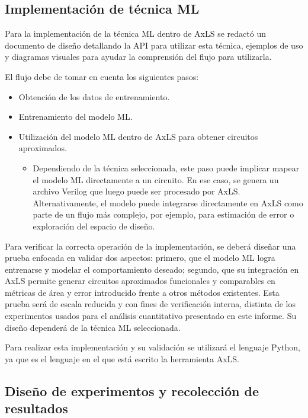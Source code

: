 \subsection{Implementación de técnica ML}

Para la implementación de la técnica ML dentro de AxLS se redactó un documento
de diseño detallando la API para utilizar esta técnica, ejemplos de uso y
diagramas visuales para ayudar la comprensión del flujo para utilizarla.

El flujo debe de tomar en cuenta los siguientes pasos:

\begin{itemize}
  \item Obtención de los datos de entrenamiento.
  \item Entrenamiento del modelo ML.
  \item Utilización del modelo ML dentro de AxLS para obtener circuitos
    aproximados.
    \begin{itemize}
      \item Dependiendo de la técnica seleccionada, este paso puede implicar
        mapear el modelo ML directamente a un circuito. En ese caso, se genera un
        archivo Verilog que luego puede ser procesado por AxLS. Alternativamente,
        el modelo puede integrarse directamente en AxLS como parte de un flujo
        más complejo, por ejemplo, para estimación de error o exploración del
        espacio de diseño.
    \end{itemize}
\end{itemize}

Para verificar la correcta operación de la implementación, se deberá diseñar
una prueba enfocada en validar dos aspectos: primero, que el modelo ML logra
entrenarse y modelar el comportamiento deseado; segundo, que su integración en
AxLS permite generar circuitos aproximados funcionales y comparables en
métricas de área y error introducido frente a otros métodos existentes. Esta
prueba será de escala reducida y con fines de verificación interna, distinta de
los experimentos usados para el análisis cuantitativo presentado en este
informe. Su diseño dependerá de la técnica ML seleccionada.

Para realizar esta implementación y su validación se utilizará el lenguaje
Python, ya que es el lenguaje en el que está escrito la herramienta AxLS.

\subsection{Diseño de experimentos y recolección de resultados}
\label{sec:metodologia_resultados}


